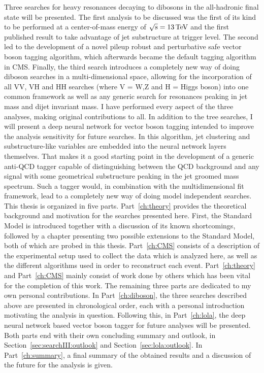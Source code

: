 Three searches for heavy resonances decaying to dibosons in the all-hadronic final state will be presented. The first analysis to be discussed was the first of its kind to be performed at a center-of-mass energy of $\sqrt{\rm{s}}=13 \,\text{Te\hspace{-.08em}V}$ and the first published result to take advantage of jet substructure at trigger level. The second led to the development of a novel pileup robust and perturbative safe vector boson tagging algorithm, which afterwards became the default tagging algorithm in CMS. Finally, the third search introduces a completely new way of doing diboson searches in a multi-dimensional space, allowing for the incorporation of all VV, VH and HH searches (where V = W,Z and H = Higgs boson) into one common framework as well as any generic search for resonances peaking in jet mass and dijet invariant mass. I have performed every aspect of the three analyses, making original contributions to all.
\newline
\newline
In addition to the tree searches, I will present a deep neural network for vector boson tagging intended to improve the analysis sensitivity for future searches. In this algorithm, jet clustering and substructure-like variables are embedded into the neural network layers themselves. That makes it a good starting point in the development of a generic anti-QCD tagger capable of distinguishing between the QCD background and any signal with some geometrical substructure peaking in the jet groomed mass spectrum. Such a tagger would, in combination with the multidimensional fit framework, lead to a completely new way of doing model independent searches.
\newline
\newline
This thesis is organized in five parts. Part~\ref{ch:theory} provides the theoretical background and motivation for the searches presented here. First, the Standard Model is introduced together with a discussion of its known shortcomings, followed by a chapter presenting two possible extensions to the Standard Model, both of which are probed in this thesis. Part~\ref{ch:CMS} consists of a description of the experimental setup used to collect the data which is analyzed here, as well as the different algorithms used in order to reconstruct each event. Part~\ref{ch:theory} and Part~\ref{ch:CMS} mainly consist of work done by others which has been vital for the completion of this work. The remaining three parts are dedicated to my own personal contributions. In Part~\ref{ch:diboson}, the three searches described above are presented in chronological order, each with a personal introduction motivating the analysis in question. Following this, in Part~\ref{ch:lola}, the deep neural network based vector boson tagger for future analyses will be presented. Both parts end with their own concluding summary and outlook, in Section~\ref{sec:searchIII:outlook} and Section~\ref{sec:lola:outlook}. In Part~\ref{ch:summary}, a final summary of the obtained results and a discussion of the future for the analysis is given.